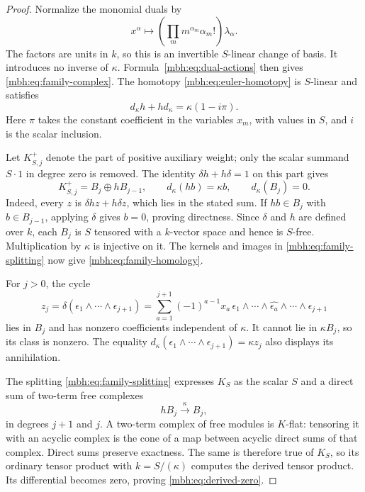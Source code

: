 \begin{proof}
Normalize the monomial duals by
\[
 x^\alpha\longmapsto
 \left(\prod_m m^{\alpha_m}\alpha_m!\right)\lambda_\alpha.
\]
The factors are units in \(k\), so this is an invertible
\(S\)-linear change of basis.  It introduces no inverse of
\(\kappa\).  Formula~\eqref{mbh:eq:dual-actions} then gives
\eqref{mbh:eq:family-complex}.
The homotopy \eqref{mbh:eq:euler-homotopy} is \(S\)-linear and
satisfies
\begin{equation}\label{mbh:eq:family-homotopy}
 d_\kappa h+hd_\kappa=\kappa(1-i\pi).
\end{equation}
Here \(\pi\) takes the constant coefficient in the variables
\(x_m\), with values in \(S\), and \(i\) is the scalar inclusion.

Let \(K_{S,j}^+\) denote the part of positive auxiliary weight;
only the scalar summand \(S\cdot1\) in degree zero is removed.
The identity \(\delta h+h\delta=1\) on this part gives
\begin{equation}\label{mbh:eq:family-splitting}
 K_{S,j}^+=B_j\oplus hB_{j-1},\qquad
 d_\kappa(hb)=\kappa b,\qquad d_\kappa(B_j)=0.
\end{equation}
Indeed, every \(z\) is
\(\delta hz+h\delta z\), which lies in the stated sum.
If \(hb\in B_j\) with \(b\in B_{j-1}\), applying
\(\delta\) gives \(b=0\), proving directness.
Since \(\delta\) and \(h\) are defined over \(k\), each \(B_j\)
is \(S\) tensored with a \(k\)-vector space and hence is
\(S\)-free.  Multiplication by \(\kappa\) is injective on it.
The kernels and images in \eqref{mbh:eq:family-splitting}
now give \eqref{mbh:eq:family-homology}.

For \(j>0\), the cycle
\begin{equation}\label{mbh:eq:torsion-cycle}
 z_j=\delta(\epsilon_1\wedge\cdots\wedge\epsilon_{j+1})
   =\sum_{a=1}^{j+1}(-1)^{a-1}x_a\,
      \epsilon_1\wedge\cdots\wedge
      \widehat{\epsilon_a}\wedge\cdots\wedge\epsilon_{j+1}
\end{equation}
lies in \(B_j\) and has nonzero coefficients independent of
\(\kappa\).  It cannot lie in \(\kappa B_j\), so its class is
nonzero.  The equality
\(d_\kappa(\epsilon_1\wedge\cdots\wedge\epsilon_{j+1})
=\kappa z_j\) also displays its annihilation.

The splitting \eqref{mbh:eq:family-splitting} expresses \(K_S\)
as the scalar \(S\) and a direct sum of two-term free complexes
\[
 hB_j\xrightarrow{\ \kappa\ }B_j,
\]
in degrees \(j+1\) and \(j\).  A two-term complex of free
modules is \(K\)-flat: tensoring it with an acyclic complex is
the cone of a map between acyclic direct sums of that complex.
Direct sums preserve exactness.  The same is therefore true of
\(K_S\), so its ordinary tensor product with \(k=S/(\kappa)\)
computes the derived tensor product.  Its differential becomes zero,
proving \eqref{mbh:eq:derived-zero}.
\end{proof}

